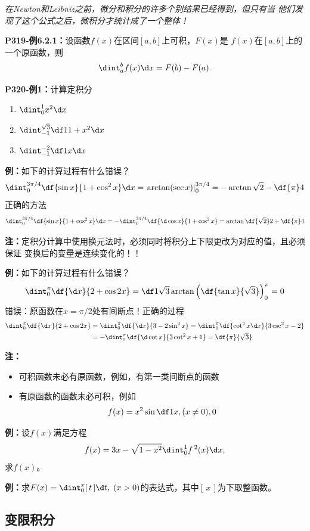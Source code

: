 {\it 在Newton和Leibniz之前，微分和积分的许多个别结果已经得到，但只有当
他们发现了这个公式之后，微积分才统计成了一个整体！}

{\bf P319-例6.2.1：}设函数$f(x)$在区间$[a,b]$上可积，$F(x)$是
$f(x)$在$[a,b]$上的一个原函数，则
$$\dint_a^bf(x)\d x=F(b)-F(a).$$

{\bf P320-例1：}计算定积分
\begin{enumerate}[(1)]
  \setlength{\itemindent}{1cm}
  \item $\dint_{0}^{1}x^2 \d x$
  \item $\dint_{-1}^{\sqrt 3}\df 1{1+x^2}\d x$
  \item $\dint_{-1}^{-2}\df 1x\d x$
\end{enumerate}

{\bf 例：}如下的计算过程有什么错误？
$$\dint_0^{3\pi/4}\df{\sin x}{1+\cos^2x}\d x
=\left.\arctan(\sec x)\right|_0^{3\pi/4}=-\arctan\sqrt2-\df{\pi}4$$
正确的方法
$$\dint_0^{3\pi/4}\df{\sin x}{1+\cos^2x}\d x
=-\dint_0^{3\pi/4}\df{\d\cos x}{1+\cos^2x}=\arctan\df{\sqrt2}2
+\df{\pi}4$$

{\bf 注：}定积分计算中使用换元法时，必须同时将积分上下限更改为对应的值，且必须保证
变换后的变量是连续变化的！！

{\bf 例：}如下的计算过程有什么错误？
$$\dint_0^{\pi}\df{\d x}{2+\cos2x}=\df1{\sqrt3}\arctan
\left(\df{\tan x}{\sqrt3}\right)_0^{\pi}=0$$
错误：原函数在$x=\pi/2$处有间断点！正确的过程
\begin{align}
	\dint_0^{\pi}\df{\d x}{2+\cos2x}&=\dint_0^{\pi}\df{\d x}
	{3-2\sin^2x}=\dint_0^{\pi}\df{\cot^2x\d x}{3\csc^2x-2}\notag\\
	&=-\dint_0^{\pi}\df{\d\cot x}{3\cot^2x+1}=\df{\pi}{\sqrt3}\notag
\end{align}

{\bf 注：}
\begin{itemize}
  \setlength{\itemindent}{1cm}
  \item 可积函数未必有原函数，例如，有第一类间断点的函数
  \item 有原函数的函数未必可积，例如
  $$f(x)=x^2\sin\df1x,(x\ne0), 0$$
\end{itemize}

{\bf 例：}设$f(x)$满足方程
$$f(x)=3x-\sqrt{1-x^2}\dint_0^1f\,^2(x)\d x,$$
求$f(x)$。

{\bf 例：}求$F(x)=\dint_0^x[\,t\,]\d t,\;(x>0)$的表达式，其中$[\,x\,]$为下取整函数。

\subsection{变限积分}

